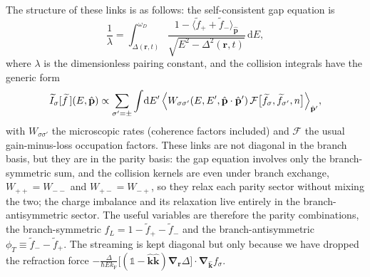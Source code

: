 \documentclass[
  aps,
  prb,
  preprint,
  superscriptaddress,
  longbibliography,
  nofootinbib
]{revtex4-2}
\newcommand{\dd}{\mathrm{d}}
\newcommand{\br}{\mathbf{r}}
\newcommand{\bk}{\mathbf{k}}
\newcommand{\bp}{\mathbf{p}}
\newcommand{\bnabla}{\boldsymbol{\nabla}}
\newcommand{\fL}{f_L}
\providecommand{\openone}{}\renewcommand{\openone}{\mathds{1}}
\begin{document}
The structure of these links is as follows: the self-consistent gap equation is
\begin{equation}
  \frac{1}{\lambda}
  = \int_{\Delta(\br,t)}^{\omega_D}
    \frac{1-\bigl\langle\widetilde f_{+}+\widetilde f_{-}\bigr\rangle_{\hat{\bp}}}{\sqrt{E^{2}-\Delta^{2}(\br,t)}}\,
    \dd E,
  \label{eq:intro_gap_branches}
\end{equation}
where \(\lambda\) is the dimensionless pairing constant, and the collision integrals have the generic form
\begin{equation}
  \widetilde I_{\sigma}[\widetilde f\,](E,\hat{\bp})
  \propto
  \sum_{\sigma'=\pm}\int\!\dd E'\,
  \Bigl\langle
  W_{\sigma\sigma'}(E,E',\hat{\bp}\cdot\hat{\bp}')\,
  \mathcal F\bigl[\widetilde f_{\sigma},\widetilde f_{\sigma'},n\bigr]
  \Bigr\rangle_{\hat{\bp}'},
  \label{eq:intro_collision_structure}
\end{equation}
with \(W_{\sigma\sigma'}\) the microscopic rates (coherence factors included) and \(\mathcal F\) the usual gain-minus-loss occupation factors.
These links are not diagonal in the branch basis, but they are in the parity basis: the gap equation involves only the branch-symmetric sum, and the collision kernels are even under branch exchange, \(W_{++}=W_{--}\) and \(W_{+-}=W_{-+}\), so they relax each parity sector without mixing the two; the charge imbalance and its relaxation live entirely in the branch-antisymmetric sector.
The useful variables are therefore the parity combinations, the branch-symmetric \(\fL=1-\widetilde f_+-\widetilde f_-\) and the branch-antisymmetric \(\phi_T\equiv\widetilde f_--\widetilde f_+\). The streaming is kept diagonal but only because we have dropped the refraction force
\(-\tfrac{\Delta}{\hbar E k_{\mathrm F}}
\bigl[(\openone-\hat{\bk}\hat{\bk})\bnabla_{\br}\Delta\bigr]\cdot
\bnabla_{\hat{\bk}}f_{\sigma}\).
\end{document}
